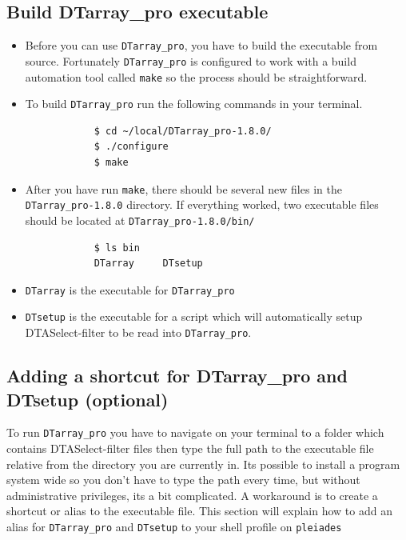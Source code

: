 \documentclass[12pt]{article}
\newcommand{\VERSION}{1.8.0}
\begin{document}
	\subsection{Build DTarray\_pro executable}
	\begin{itemize}
		\item Before you can use \texttt{DTarray\_pro}, you have to build the executable from source. Fortunately \texttt{DTarray\_pro} is configured to work with a build automation tool called \texttt{make} so the process should be straightforward.
		
		\item To build \texttt{DTarray\_pro} run the following commands in your terminal.
		
		\begin{lstlisting}
			$ cd ~/local/DTarray_pro-1.8.0/
			$ ./configure
			$ make
		\end{lstlisting}
		
		\item After you have run \texttt{make}, there should be several new files in the \texttt{DTarray\_pro-\VERSION} directory.  If everything worked, two executable files should be located at \texttt{DTarray\_pro-\VERSION/bin/}
		
		\begin{lstlisting}
			$ ls bin
			DTarray		DTsetup
		\end{lstlisting}
		
		\item \texttt{DTarray} is the executable for \texttt{DTarray\_pro}
		
		\item \texttt{DTsetup} is the executable for a script which will automatically setup DTASelect-filter to be read into \texttt{DTarray\_pro}.
		
	\end{itemize}

	\subsection{Adding a shortcut for DTarray\_pro and DTsetup (optional)}
	
	To run \texttt{DTarray\_pro} you have to navigate on your terminal to a folder which contains DTASelect-filter files then type the full path to the executable file relative from the directory you are currently in.  Its possible to install a program system wide so you don't have to type the path every time, but without administrative privileges, its a bit complicated. A workaround is to create a shortcut or alias to the executable file.  This section will explain how to add an alias for \texttt{DTarray\_pro} and \texttt{DTsetup} to your shell profile on \texttt{pleiades}
	
\end{document}
